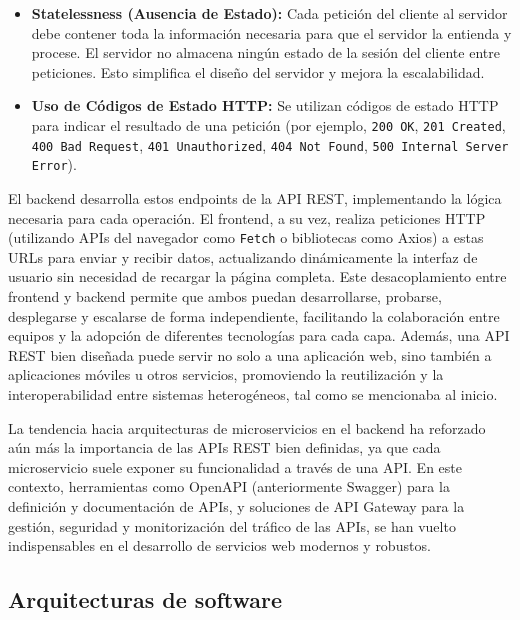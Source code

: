 \begin{itemize}
    \item \textbf{Statelessness (Ausencia de Estado):} Cada petici\'{o}n del cliente al servidor debe contener toda la informaci\'{o}n necesaria para que el servidor la entienda y procese. El servidor no almacena ning\'{u}n estado de la sesi\'{o}n del cliente entre peticiones. Esto simplifica el dise\~{n}o del servidor y mejora la escalabilidad.
    \item \textbf{Uso de C\'{o}digos de Estado HTTP:} Se utilizan c\'{o}digos de estado HTTP para indicar el resultado de una petici\'{o}n (por ejemplo, \texttt{200 OK}, \texttt{201 Created}, \texttt{400 Bad Request}, \texttt{401 Unauthorized}, \texttt{404 Not Found}, \texttt{500 Internal Server Error}).
\end{itemize}

El backend desarrolla estos endpoints de la API REST, implementando la l\'{o}gica necesaria para cada operaci\'{o}n. El frontend, a su vez, realiza peticiones HTTP (utilizando APIs del navegador como \texttt{Fetch} o bibliotecas como Axios) a estas URLs para enviar y recibir datos, actualizando din\'{a}micamente la interfaz de usuario sin necesidad de recargar la p\'{a}gina completa. Este desacoplamiento entre frontend y backend permite que ambos puedan desarrollarse, probarse, desplegarse y escalarse de forma independiente, facilitando la colaboraci\'{o}n entre equipos y la adopci\'{o}n de diferentes tecnolog\'{i}as para cada capa. Adem\'{a}s, una API REST bien dise\~{n}ada puede servir no solo a una aplicaci\'{o}n web, sino tambi\'{e}n a aplicaciones m\'{o}viles u otros servicios, promoviendo la reutilizaci\'{o}n y la interoperabilidad entre sistemas heterog\'{e}neos, tal como se mencionaba al inicio.

La tendencia hacia arquitecturas de microservicios en el backend ha reforzado a\'{u}n m\'{a}s la importancia de las APIs REST bien definidas, ya que cada microservicio suele exponer su funcionalidad a trav\'{e}s de una API. En este contexto, herramientas como OpenAPI (anteriormente Swagger) para la definici\'{o}n y documentaci\'{o}n de APIs, y soluciones de API Gateway para la gesti\'{o}n, seguridad y monitorizaci\'{o}n del tr\'{a}fico de las APIs, se han vuelto indispensables en el desarrollo de servicios web modernos y robustos.

\subsection{Arquitecturas de software}

